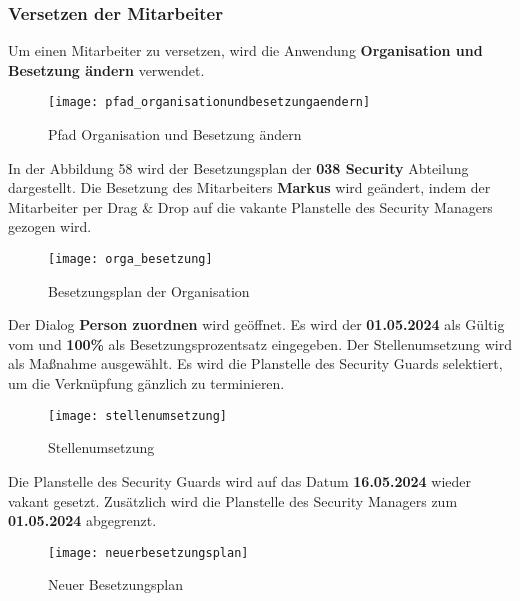 \subsubsection{Versetzen der Mitarbeiter}
Um einen Mitarbeiter zu versetzen, wird die Anwendung \textbf{Organisation und Besetzung ändern} verwendet.
\begin{figure}[H]
	\centering
	\texttt{[image: pfad\_organisationundbesetzungaendern]}
	\caption{Pfad Organisation und Besetzung ändern}
	\label{fig:pfad_organisationundbesetzungaendern}
\end{figure}
In der Abbildung 58 wird der Besetzungsplan der \textbf{038 Security} Abteilung dargestellt. Die Besetzung des Mitarbeiters \textbf{Markus} wird geändert, indem der Mitarbeiter per Drag \& Drop auf die vakante Planstelle des Security Managers gezogen wird.
\begin{figure}[H]
	\centering
	\texttt{[image: orga\_besetzung]}
	\caption{Besetzungsplan der Organisation}
	\label{fig:orga_besetzung}
\end{figure}
Der Dialog \textbf{Person zuordnen} wird geöffnet. Es wird der \textbf{01.05.2024} als Gültig vom und \textbf{100\%} als Besetzungsprozentsatz eingegeben. Der Stellenumsetzung wird als Maßnahme ausgewählt. Es wird die Planstelle des Security Guards selektiert, um die Verknüpfung gänzlich zu terminieren.
\begin{figure}[H]
	\centering
	\texttt{[image: stellenumsetzung]}
	\caption{Stellenumsetzung}
	\label{fig:stellenumsetzung}
\end{figure}
Die Planstelle des Security Guards wird auf das Datum \textbf{16.05.2024} wieder vakant gesetzt. Zusätzlich wird die Planstelle des Security Managers zum \textbf{01.05.2024} abgegrenzt.
\begin{figure}[H]
	\centering
	\texttt{[image: neuerbesetzungsplan]}
	\caption{Neuer Besetzungsplan}
	\label{fig:neuerbesetzungsplan}
\end{figure}
\clearpage